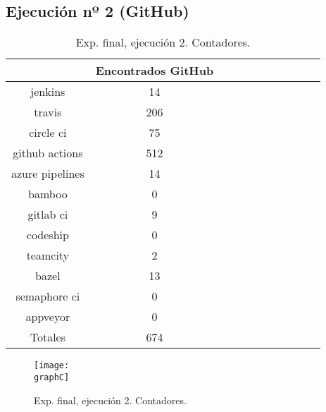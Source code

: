 \subsection{Ejecución nº 2 (GitHub)}
\begin{table}[h]
  \centering
  \caption{Exp. final, ejecución 2. Contadores.}
  \label{tab:tabla_f2_1}

\begin{footnotesize}
\renewcommand{\arraystretch}{1.5} %
\begin{tabular}{ccccccccccc}
  \hline
  {} &  Encontrados GitHub \\
  \hline
  jenkins         &                  14 \\
  travis          &                 206 \\
  circle ci       &                  75 \\
  github actions  &                 512 \\
  azure pipelines &                  14 \\
  bamboo          &                   0 \\
  gitlab ci       &                   9 \\
  codeship        &                   0 \\
  teamcity        &                   2 \\
  bazel           &                  13 \\
  semaphore ci    &                   0 \\
  appveyor        &                   0 \\
  \hline
  Totales         &                 674 \\
 \end{tabular}
\end{footnotesize}

\end{table}

\begin{figure}
  \centering
  \texttt{[image: \\graphC]}
  \caption{Exp. final, ejecución 2. Contadores.}
\end{figure}

